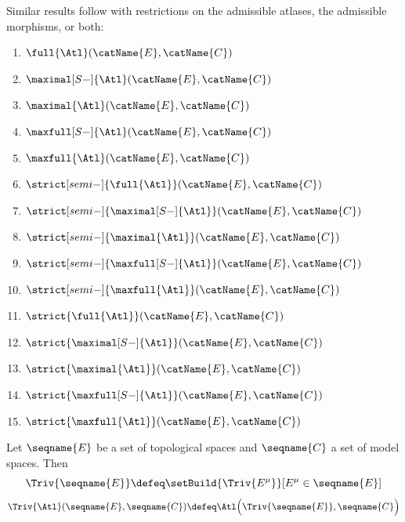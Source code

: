 \documentclass{article}
\begin{document}
\begin{lemma}
Similar results follow with restrictions on the admissible atlases,
the admissible morphisms, or both:
\begin{enumerate}
\item $\full{\Atl}(\catName{E}, \catName{C})$
\item $\maximal[S-]{\Atl}(\catName{E}, \catName{C})$
\item $\maximal{\Atl}(\catName{E}, \catName{C})$
\item $\maxfull[S-]{\Atl}(\catName{E}, \catName{C})$
\item $\maxfull{\Atl}(\catName{E}, \catName{C})$
\item $\strict[semi-]{\full{\Atl}}(\catName{E}, \catName{C})$
\item $\strict[semi-]{\maximal[S-]{\Atl}}(\catName{E}, \catName{C})$
\item $\strict[semi-]{\maximal{\Atl}}(\catName{E}, \catName{C})$
\item $\strict[semi-]{\maxfull[S-]{\Atl}}(\catName{E}, \catName{C})$
\item $\strict[semi-]{\maxfull{\Atl}}(\catName{E}, \catName{C})$
\item $\strict{\full{\Atl}}(\catName{E}, \catName{C})$
\item $\strict{\maximal[S-]{\Atl}}(\catName{E}, \catName{C})$
\item $\strict{\maximal{\Atl}}(\catName{E}, \catName{C})$
\item $\strict{\maxfull[S-]{\Atl}}(\catName{E}, \catName{C})$
\item $\strict{\maxfull{\Atl}}(\catName{E}, \catName{C})$
\end{enumerate}
\end{lemma}

\begin{definition}
\label{def:M-triv}
Let $\seqname{E}$ be a set of topological spaces and $\seqname{C}$ a
set of model spaces. Then
\begin{equation}
\Triv{\seqname{E}} \defeq \setBuild {\Triv{E^\mu}}[E^\mu \in \seqname{E}]
\end{equation}
\begin{equation}
\Triv{\Atl}(\seqname{E}, \seqname{C}) \defeq
\Atl \Big ( \Triv{\seqname{E}}, \seqname{C} \Big )
\end{equation}
\end{definition}
\end{document}
